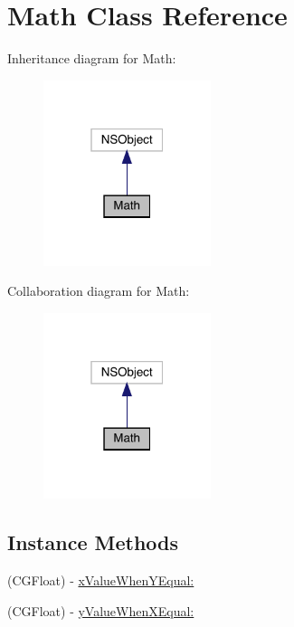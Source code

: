 \hypertarget{interface_math}{}\section{Math Class Reference}
\label{interface_math}


Inheritance diagram for Math\+:\nopagebreak
\begin{figure}[H]
\begin{center}
\leavevmode
\includegraphics[width=139pt]{interface_math__inherit__graph}
\end{center}
\end{figure}


Collaboration diagram for Math\+:\nopagebreak
\begin{figure}[H]
\begin{center}
\leavevmode
\includegraphics[width=139pt]{interface_math__coll__graph}
\end{center}
\end{figure}
\subsection*{Instance Methods}
\begin{DoxyCompactItemize}
\item 
(C\+G\+Float) -\/ \mbox{\hyperlink{interface_math_a1f506725e2e40cde48a7438935ea22e8}{x\+Value\+When\+Y\+Equal\+:}}
\item 
(C\+G\+Float) -\/ \mbox{\hyperlink{interface_math_a30abd3a6eca23c2db7910c7efc91b4b3}{y\+Value\+When\+X\+Equal\+:}}
\end{DoxyCompactItemize}
